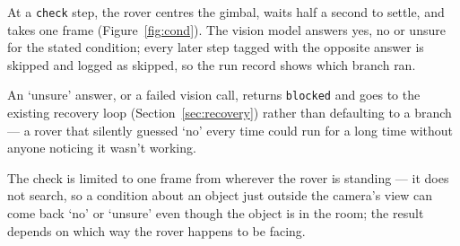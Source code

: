 At a \texttt{check} step, the rover centres the gimbal, waits half a second to settle, and
takes one frame (Figure~\ref{fig:cond}). The vision model answers yes, no or unsure for the
stated condition; every later step tagged with the opposite answer is skipped and logged as
skipped, so the run record shows which branch ran.

%

An `unsure' answer, or a failed vision call, returns \texttt{blocked} and goes to the existing
recovery loop (Section~\ref{sec:recovery}) rather than defaulting to a branch — a rover that
silently guessed `no' every time could run for a long time without anyone noticing it wasn't
working.

%

The check is limited to one frame from wherever the rover is standing — it does not search, so
a condition about an object just outside the camera's view can come back `no' or `unsure' even
though the object is in the room; the result depends on which way the rover happens to be
facing.

